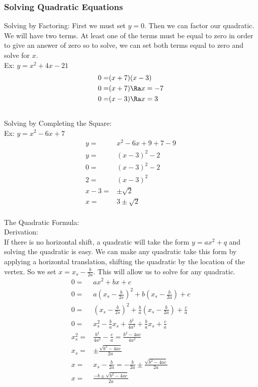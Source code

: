 \subsubsection{Solving Quadratic Equations}
Solving by Factoring:
First we must set $y=0$. Then we can factor our quadratic. We will have two terms. At least one of the terms must be equal to zero in order to give an answer of zero so to solve, we can set both terms equal to zero and solve for $x$.\\
Ex: $y=x^2+4x-21$
\begin{align*}
    0=&(x+7)(x-3)\\
    0=&(x+7)\Ra x=-7\\
    0=&(x-3)\Ra x=3
\end{align*}
\\
Solving by Completing the Square:\\
Ex: $y=x^2-6x+7$
\begin{align*}
    y=&x^2-6x+9+7-9\\
    y=&(x-3)^2-2\\
    0=&(x-3)^2-2\\
    2=&(x-3)^2\\
    x-3=&\pm \sqrt{2}\\
    x=&3\pm \sqrt{2}
\end{align*}
\\
The Quadratic Formula:\\
Derivation:\\
If there is no horizontal shift, a quadratic will take the form $y=ax^2+q$ and solving the quadratic is easy. We can make any quadratic take this form by applying a horizontal translation, shifting the quadratic by the location of the vertex. So we set $x=x_s-\frac{b}{2a}$. This will allow us to solve for any quadratic.
\begin{align*}
    0=&ax^2+bx+c\\
    0=&a\left(x_s-\frac{b}{2s}\right)^2+b\left(x_s-\frac{b}{2a}\right)+c\\
    0=&\left(x_s-\frac{b}{2s}\right)^2+\frac{b}{a}\left(x_s-\frac{b}{2a}\right)+\frac{c}{a}\\
    0=&x_s^2-\frac{b}{a}x_s+\frac{b^2}{4a^2}+\frac{b}{a}x_s+\frac{c}{a}\\
    x_s^2=&\frac{b^2}{4a^2}-\frac{c}{a}=\frac{b^2-4ac}{4a^2}\\
    x_s=&\pm\frac{\sqrt{b^2-4ac}}{2a}\\
    x=&x_s-\frac{b}{2a}=-\frac{b}{2a}\pm\frac{\sqrt{b^2-4ac}}{2a}\\
    x=&\frac{-b\pm\sqrt{b^2-4ac}}{2a}
\end{align*}
